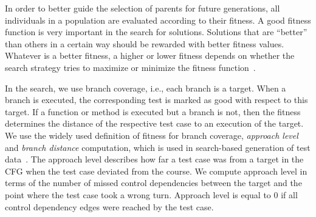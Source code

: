 \documentclass[paper=a4,%
  twoside,%
  BCOR4mm,%
  abstract=true,%
  toc=bibliography,%
  chapterprefix=true,%
  toc=bibliographynumbered,%
  open=right,%
  english,%
  pagesize=pdftex]{scrreprt}
\newcommand{\cfg}{\ac{CFG}\xspace}
\begin{document}
In order to better guide the selection of parents for future generations, all individuals in a population are evaluated according to their fitness. A good fitness function is very important in the search for solutions. Solutions that are ``better'' than others in a certain way should be rewarded with better fitness values. Whatever is a better fitness, a higher or lower fitness depends on whether the search strategy tries to maximize or minimize the fitness function~\cite{McMinn_2004}.



In the search, we use branch coverage, i.e., each branch is a target. When a branch is executed, the corresponding test is marked as good with respect to this target. If a function or method is executed but a branch is not, then the fitness determines the distance of the respective test case to an execution of the target. We use the widely used definition of fitness for branch coverage, \emph{approach level} and \emph{branch distance} computation, which is used in search-based generation of test data~\cite{McMinn_2004}. The approach level describes how far a test case was from a target in the \cfg when the test case deviated from the course. We compute approach level in terms of the number of missed control dependencies between the target and the point where the test case took a wrong turn. Approach level is equal to $0$ if all control dependency edges were reached by the test case.
\end{document}
